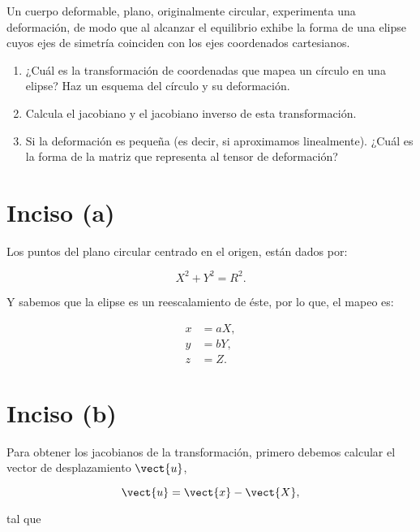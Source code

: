 \documentclass[../main.tex]{subfiles}
\begin{document}
\begin{problema}
	Un cuerpo deformable, plano, originalmente circular, experimenta
	una deformación, de modo que al alcanzar el equilibrio exhibe la
	forma de una elipse cuyos ejes de simetría coinciden con los ejes
	coordenados cartesianos.

	\begin{enumerate}
		\item ¿Cuál es la transformación de coordenadas que mapea un
		      círculo en una elipse? Haz un esquema del círculo y su
		      deformación.
		\item Calcula el jacobiano y el jacobiano inverso de esta
		      transformación.
		\item Si la deformación es pequeña (es decir, si aproximamos linealmente).
		      ¿Cuál es la forma de la matriz que representa al tensor de deformación?
	\end{enumerate}
	\startsolution

	\section{Inciso (a)}
	Los puntos del plano circular centrado en el origen, están dados por:

	\begin{equation*}
		X^{2} + Y^{2} = R^{2}.
	\end{equation*}

	Y sabemos que la elipse es un reescalamiento de éste, por lo que, el mapeo es:

	\begin{equation}
		\begin{aligned}
			x & = aX, \\
			y & = bY, \\
			z & = Z.
		\end{aligned}
		\label{eq:mapping}
	\end{equation}

	\section{Inciso (b)}

	Para obtener los jacobianos de la transformación, primero debemos calcular el vector
	de desplazamiento \(\vect{u}\),

	\begin{equation*}
		\vect{u} = \vect{x} - \vect{X},
	\end{equation*}

	tal que


\end{problema}
\end{document}
